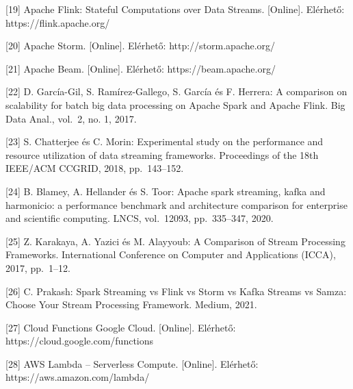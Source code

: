 \documentclass[
]{article}
\begin{document}
{[}19{]} Apache Flink: Stateful Computations over Data Streams.
{[}Online{]}. Elérhető: https://flink.apache.org/

{[}20{]} Apache Storm. {[}Online{]}. Elérhető: http://storm.apache.org/

{[}21{]} Apache Beam. {[}Online{]}. Elérhető: https://beam.apache.org/

{[}22{]} D. García-Gil, S. Ramírez-Gallego, S. García és F. Herrera: A
comparison on scalability for batch big data processing on Apache Spark
and Apache Flink. Big Data Anal., vol.~2, no. 1, 2017.

{[}23{]} S. Chatterjee és C. Morin: Experimental study on the
performance and resource utilization of data streaming frameworks.
Proceedings of the 18th IEEE/ACM CCGRID, 2018, pp.~143--152.

{[}24{]} B. Blamey, A. Hellander és S. Toor: Apache spark streaming,
kafka and harmonicio: a performance benchmark and architecture
comparison for enterprise and scientific computing. LNCS, vol.~12093,
pp.~335--347, 2020.

{[}25{]} Z. Karakaya, A. Yazici és M. Alayyoub: A Comparison of Stream
Processing Frameworks. International Conference on Computer and
Applications (ICCA), 2017, pp.~1--12.

{[}26{]} C. Prakash: Spark Streaming vs Flink vs Storm vs Kafka Streams
vs Samza: Choose Your Stream Processing Framework. Medium, 2021.

{[}27{]} Cloud Functions \textbar{} Google Cloud. {[}Online{]}.
Elérhető: https://cloud.google.com/functions

{[}28{]} AWS Lambda -- Serverless Compute. {[}Online{]}. Elérhető:
https://aws.amazon.com/lambda/
\end{document}
